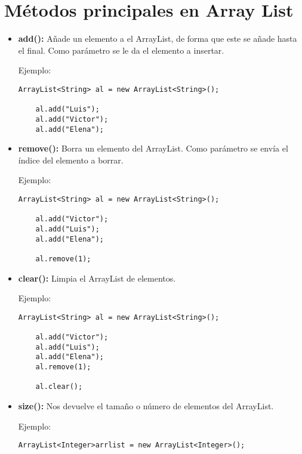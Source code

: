 \documentclass[12pt, letterpaper]{article} %
\begin{document}
\section*{Métodos principales en Array List}
\begin{itemize}
    \item \textbf{add():} Añade un elemento a el ArrayList, de forma que este se añade hasta el final. Como parámetro se le da el elemento a insertar.
    
    Ejemplo:
    \lstset{language = Java, breaklines=true, basicstyle=\footnotesize}
    \begin{lstlisting}[frame=single]
    ArrayList<String> al = new ArrayList<String>();
    
    al.add("Luis");
    al.add("Victor");
    al.add("Elena");
    \end{lstlisting}
    
    \item \textbf{remove():} Borra un elemento del ArrayList. Como parámetro se envía el índice del elemento a borrar.
    
    Ejemplo:
    \lstset{language = Java, breaklines=true, basicstyle=\footnotesize}
    \begin{lstlisting}[frame=single]
    ArrayList<String> al = new ArrayList<String>();

    al.add("Victor");    
    al.add("Luis");    
    al.add("Elena");
    
    al.remove(1);
    \end{lstlisting}
    
    \item \textbf{clear():} Limpia el ArrayList de elementos.
    
    Ejemplo:
    \lstset{language = Java, breaklines=true, basicstyle=\footnotesize}
    \begin{lstlisting}[frame=single]
    ArrayList<String> al = new ArrayList<String>();

    al.add("Victor");
    al.add("Luis");
    al.add("Elena");
    al.remove(1);

    al.clear();
    \end{lstlisting}
    
    \item \textbf{size():} Nos devuelve el tamaño o número de elementos del ArrayList.
    
    Ejemplo:
    \lstset{language = Java, breaklines=true, basicstyle=\footnotesize}
    \begin{lstlisting}[frame=single]
    ArrayList<Integer>arrlist = new ArrayList<Integer>();
    

\end{lstlisting}
\end{itemize}
\end{document}
